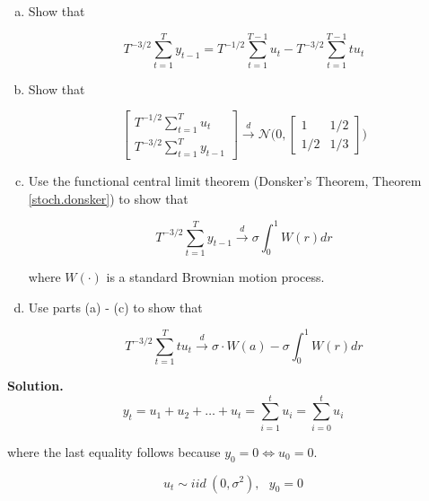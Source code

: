 \begin{enumerate}[(a)]

\item Show that

\[
 T^{-3/2} \sum_{t=1}^T y_{t-1} =T^{-1/2}  \sum_{t=1}^{T- 1} u_{t} -  T^{-3/2} \sum_{t=1}^{T - 1} t u_{t}
\]

\item Show that

\[
\begin{bmatrix} T^{-1/2} \sum_{t=1}^T u_t \\ T^{-3/2} \sum_{t=1}^T y_{t-1} \end{bmatrix} \xrightarrow{d} \mathcal{N} \bigg(0, \begin{bmatrix} 1 & 1/2 \\ 1/2 & 1/3 \end{bmatrix} \bigg)
\]

\item Use the functional central limit theorem (Donsker's Theorem, Theorem \ref{stoch.donsker}) to show that 

\[
T^{-3/2} \sum_{t=1}^T y_{t-1} \xrightarrow{d} \sigma \int_0^1 W(r) dr
\]

where \(W(\cdot)\) is a standard Brownian motion process.

\item Use parts (a) - (c) to show that

\[
T^{-3/2} \sum_{t=1}^T t u_t \xrightarrow{d} \sigma \cdot W(a) - \sigma \int_0^1 W(r) dr
\]

\end{enumerate}


\textbf{Solution.} \[
y_t = u_1 + u_2 + \ldots + u_t = \sum_{i=1}^t u_i = \sum_{i=0}^t u_i
\]

where the last equality follows because \(y_0 = 0 \iff u_0 = 0\).

\[
u_t \sim iid \ (0, \sigma^2), \ \ \ y_0 = 0
\]

